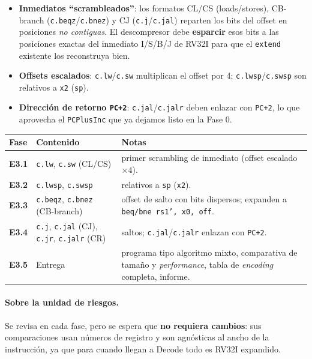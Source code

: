 \documentclass[11pt]{article}
\newcommand{\code}[1]{\texttt{#1}}
\begin{document}
\begin{itemize}[leftmargin=1.6em]
  \item \textbf{Inmediatos ``scrambleados''}: los formatos CL/CS (loads/stores),
        CB-branch (\code{c.beqz}/\code{c.bnez}) y CJ (\code{c.j}/\code{c.jal})
        reparten los bits del offset en posiciones \emph{no contiguas}. El
        descompresor debe \textbf{esparcir} esos bits a las posiciones exactas del
        inmediato I/S/B/J de RV32I para que el \code{extend} existente los
        reconstruya bien.
  \item \textbf{Offsets escalados}: \code{c.lw}/\code{c.sw} multiplican el offset
        por 4; \code{c.lwsp}/\code{c.swsp} son relativos a \code{x2} (\code{sp}).
  \item \textbf{Dirección de retorno \code{PC+2}}: \code{c.jal}/\code{c.jalr}
        deben enlazar con \code{PC+2}, lo que aprovecha el \code{PCPlusInc} que ya
        dejamos listo en la Fase 0.
\end{itemize}

\begin{center}
\small
\begin{tabular}{@{}llp{7.2cm}@{}}
\toprule
Fase & Contenido & Notas \\
\midrule
\textbf{E3.1} & \code{c.lw}, \code{c.sw} (CL/CS) & primer scrambling de inmediato (offset escalado $\times 4$). \\
\textbf{E3.2} & \code{c.lwsp}, \code{c.swsp} & relativos a \code{sp} (\code{x2}). \\
\textbf{E3.3} & \code{c.beqz}, \code{c.bnez} (CB-branch) & offset de salto con bits dispersos; expanden a \code{beq/bne rs1', x0, off}. \\
\textbf{E3.4} & \code{c.j}, \code{c.jal} (CJ), \code{c.jr}, \code{c.jalr} (CR) & saltos; \code{c.jal}/\code{c.jalr} enlazan con \code{PC+2}. \\
\textbf{E3.5} & Entrega & programa tipo algoritmo mixto, comparativa de tamaño y \emph{performance}, tabla de \emph{encoding} completa, informe. \\
\bottomrule
\end{tabular}
\end{center}

\paragraph{Sobre la unidad de riesgos.} Se revisa en cada fase, pero se espera que
\textbf{no requiera cambios}: sus comparaciones usan números de registro y son
agnósticas al ancho de la instrucción, ya que para cuando llegan a Decode todo es
RV32I expandido.
\end{document}
